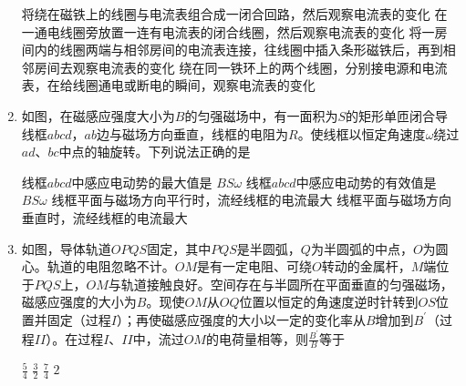 \begin{enumerate}
\fourchoices
{将绕在磁铁上的线圈与电流表组合成一闭合回路，然后观察电流表的变化}
{在一通电线圈旁放置一连有电流表的闭合线圈，然后观察电流表的变化}
{将一房间内的线圈两端与相邻房间的电流表连接，往线圈中插入条形磁铁后，再到相邻房间去观察电流表的变化}
{绕在同一铁环上的两个线圈，分别接电源和电流表，在给线圈通电或断电的瞬间，观察电流表的变化}




\item 
{}
如图，在磁感应强度大小为$ B $的匀强磁场中，有一面积为$ S $的矩形单匝闭合导线框$ abcd $，$ ab $边与磁场方向垂直，线框的电阻为$ R $。使线框以恒定角速度$ \omega $绕过$ ad $、$ bc $中点的轴旋转。下列说法正确的是  


\begin{minipage}[h!]{0.7\linewidth}
\vspace{0.3em}
\fourchoices
{线框$ abcd $中感应电动势的最大值是 $B S \omega$}
{线框$ abcd $中感应电动势的有效值是 $B S \omega$}
{线框平面与磁场方向平行时，流经线框的电流最大}
{线框平面与磁场方向垂直时，流经线框的电流最大}

\vspace{0.3em}
\end{minipage}
\hfill
\begin{minipage}[h!]{0.3\linewidth}
\flushright
\vspace{0.3em}

\vspace{0.3em}
\end{minipage}	


\item 
{}
如图，导体轨道$ OPQS $固定，其中$ PQS $是半圆弧，$ Q $为半圆弧的中点，$ O $为圆心。轨道的电阻忽略不计。$ OM $是有一定电阻、可绕$ O $转动的金属杆，$ M $端位于$ PQS $上，$ OM $与轨道接触良好。空间存在与半圆所在平面垂直的匀强磁场，磁感应强度的大小为$ B $。现使$ OM $从$ OQ $位置以恒定的角速度逆时针转到$ OS $位置并固定（过程$ I $）；再使磁感应强度的大小以一定的变化率从$ B $增加到$ B ^{\prime} $（过程$ II $）。在过程$ I $、$ II $中，流过$ OM $的电荷量相等，则$\frac { B ^ { \prime } } { B }$等于  

\begin{minipage}[h!]{0.7\linewidth}
\vspace{0.3em}
\fourchoices
{$ \frac { 5 } { 4 } $}
{$ \frac { 3 } { 2 } $}
{$ \frac { 7 } { 4 } $}
{$ 2 $}
\vspace{0.3em}
\end{minipage}
\hfill
\begin{minipage}[h!]{0.3\linewidth}
\flushright
\vspace{0.3em}

\vspace{0.3em}
\end{minipage}


\end{enumerate}
